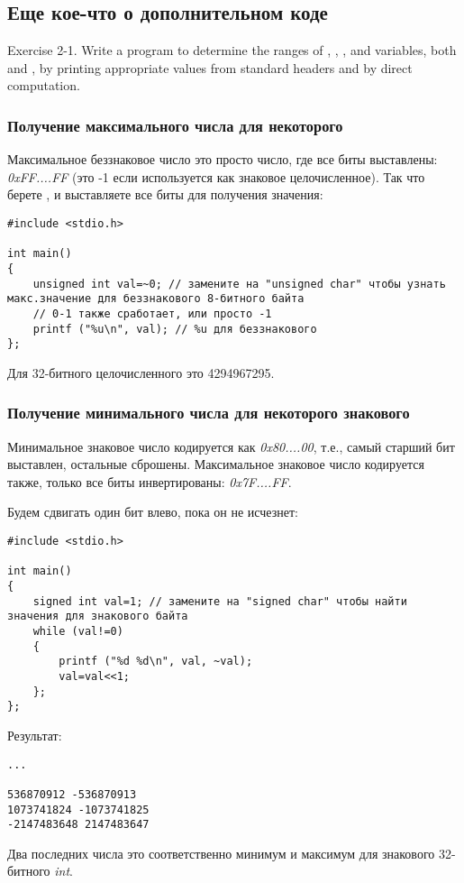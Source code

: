 \subsection{Еще кое-что о дополнительном коде}

\epigraph{Exercise 2-1. Write a program to determine the ranges of , , , and 
variables, both  and , by printing appropriate values from standard headers
and by direct computation.}{\KRBook}

\subsubsection{Получение максимального числа для некоторого }

Максимальное беззнаковое число это просто число, где все биты выставлены: \emph{0xFF....FF}
(это -1 если  используется как знаковое целочисленное).
Так что берете , и выставляете все биты для получения значения:

\begin{lstlisting}[style=customc]
#include <stdio.h>

int main()
{
	unsigned int val=~0; // замените на "unsigned char" чтобы узнать макс.значение для беззнакового 8-битного байта
	// 0-1 также сработает, или просто -1
	printf ("%u\n", val); // %u для беззнакового
};
\end{lstlisting}

Для 32-битного целочисленного это 4294967295.

\subsubsection{Получение минимального числа для некоторого знакового }

Минимальное знаковое число кодируется как \emph{0x80....00}, т.е., самый старший бит выставлен, остальные сброшены.
Максимальное знаковое число кодируется также, только все биты инвертированы: \emph{0x7F....FF}.

Будем сдвигать один бит влево, пока он не исчезнет:

\begin{lstlisting}[style=customc]
#include <stdio.h>

int main()
{
	signed int val=1; // замените на "signed char" чтобы найти значения для знакового байта
	while (val!=0)
	{
		printf ("%d %d\n", val, ~val);
		val=val<<1;
	};
};
\end{lstlisting}

Результат:

\begin{lstlisting}
...

536870912 -536870913
1073741824 -1073741825
-2147483648 2147483647
\end{lstlisting}

Два последних числа это соответственно минимум и максимум для знакового 32-битного \emph{int}.

